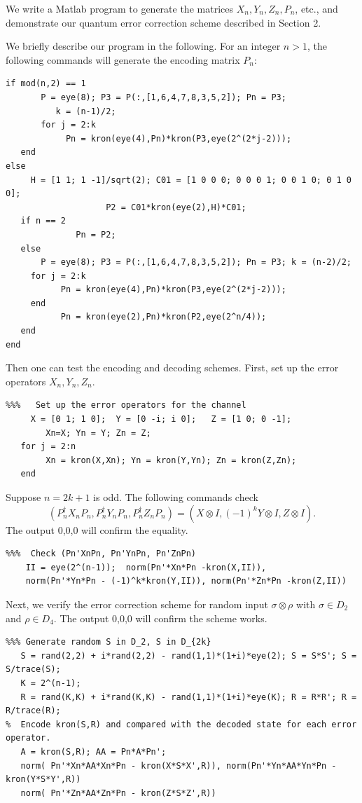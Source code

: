 \documentclass[11pt]{article}
\begin{document}
We write a Matlab program to generate the matrices $X_n, Y_n, Z_n, P_n$,
etc.,  and demonstrate our quantum error correction scheme
described in Section 2.

We briefly describe our program in the following.
For an integer $n > 1$, the following commands will generate the encoding 
matrix $P_n$:
\begin{verbatim}
if mod(n,2) == 1   
       P = eye(8); P3 = P(:,[1,6,4,7,8,3,5,2]); Pn = P3;
          k = (n-1)/2;
       for j = 2:k
            Pn = kron(eye(4),Pn)*kron(P3,eye(2^(2*j-2)));
   end 
else 
     H = [1 1; 1 -1]/sqrt(2); C01 = [1 0 0 0; 0 0 0 1; 0 0 1 0; 0 1 0 0]; 
                    P2 = C01*kron(eye(2),H)*C01;   
   if n == 2
              Pn = P2;
   else
       P = eye(8); P3 = P(:,[1,6,4,7,8,3,5,2]); Pn = P3; k = (n-2)/2;
     for j = 2:k
           Pn = kron(eye(4),Pn)*kron(P3,eye(2^(2*j-2)));
     end  
           Pn = kron(eye(2),Pn)*kron(P2,eye(2^n/4));
   end
end
\end{verbatim}
Then one can test the encoding and decoding schemes. First, set up the error operators
$X_n, Y_n, Z_n$. 
\begin{verbatim}
%%%   Set up the error operators for the channel
     X = [0 1; 1 0];  Y = [0 -i; i 0];   Z = [1 0; 0 -1];  
        Xn=X; Yn = Y; Zn = Z;
   for j = 2:n
        Xn = kron(X,Xn); Yn = kron(Y,Yn); Zn = kron(Z,Zn);
   end
\end{verbatim}
Suppose $n = 2k+1$ is odd. The following commands check 
\begin{equation} \label{odd-a}
(P_n^\dag X_nP_n, P_n^\dag Y_nP_n, P_n^\dag Z_nP_n) = 
(X\otimes I, (-1)^k Y \otimes I, Z\otimes I).
\end{equation}
The output 0,0,0 will confirm the equality.
\begin{verbatim}
%%%  Check (Pn'XnPn, Pn'YnPn, Pn'ZnPn)
    II = eye(2^(n-1));  norm(Pn'*Xn*Pn -kron(X,II)), 
    norm(Pn'*Yn*Pn - (-1)^k*kron(Y,II)), norm(Pn'*Zn*Pn -kron(Z,II))
\end{verbatim}
Next, we verify the error correction scheme for random input $\sigma \otimes \rho$
with $\sigma \in D_2$ and $\rho \in D_4$. The output 0,0,0 will confirm the scheme works.
\begin{verbatim}
%%% Generate random S in D_2, S in D_{2k}
   S = rand(2,2) + i*rand(2,2) - rand(1,1)*(1+i)*eye(2); S = S*S'; S = S/trace(S); 
   K = 2^(n-1);    
   R = rand(K,K) + i*rand(K,K) - rand(1,1)*(1+i)*eye(K); R = R*R'; R = R/trace(R);
%  Encode kron(S,R) and compared with the decoded state for each error operator.
   A = kron(S,R); AA = Pn*A*Pn'; 
   norm( Pn'*Xn*AA*Xn*Pn - kron(X*S*X',R)), norm(Pn'*Yn*AA*Yn*Pn - kron(Y*S*Y',R))
   norm( Pn'*Zn*AA*Zn*Pn - kron(Z*S*Z',R))
\end{verbatim}
\end{document}
